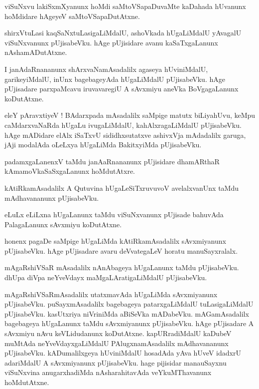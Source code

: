 \documentclass{article}
\begin{document}
\begin{mn}%
viSuNxvu lakiSxmXyanunx hoMdi saMtoVSapaDuvaMte kaDahada hUvanunx hoMdidare hAgeyeV 
saMtoVSapaDutAtxne.
\end{mn}

\begin{mn}%
shirxVtuLasi kaqSaNxtuLasigaLiMdalU, ashoVkada hUgaLiMdalU yAvagalU viSuNxvanunx pUjisabeVku. hAge 
pUjisidare avanu kaSaTxgaLanunx nAshamADutAtxne.
\end{mn}

\begin{mn}%
I janAdaRnananunx shArxvaNamAsadalilx agaseya hUviniMdalU, garikeyiMdalU, inUnx bagebageyAda 
hUgaLiMdalU pUjisabeVku. hAge pUjisadare parxpaMcavu iruvavaregiU A sAvxmiyu aneVka BoVgagaLanunx 
koDutAtxne.
\end{mn}

\begin{mn}%
eleY pAravxtiyeV ! BAdarxpada mAsadalilx saMpige matutx biLiyahUvu, keMpu caMdarxvaNaRda hUgaLu 
ivugaLiMdalU, kahAlxragaLiMdalU pUjisabeVku. hAge mADidare elAlx iSaTxvU sididhxsutatxve ashivxVja 
mAdadalilx garuga, jAji modalAda oLeLxya hUgaLiMda BakitxyiMda pUjisabeVku.
\end{mn}

\begin{mn}%
padamxgaLanenxV taMdu janAaRnananunx pUjisidare dhamARthaR kAmamoVkaSaSxgaLanunx hoMdutAtxre.
\end{mn}

\begin{mn}%
kAtiRkamAsadalilx A Qutuvina hUgaLeSiTxruvuvoV avelalxvanUnx taMdu mAdhavananunx pUjisabeVku.
\end{mn}

\begin{mn}%
eLuLx eLiLxna hUgaLanunx taMdu viSuNxvanunx pUjisade bahuvAda PalagaLanunx sAvxmiyu koDutAtxne.
\end{mn}

\begin{mn}%
honenx pagaDe saMpige hUgaLiMda kAtiRkamAsadalilx sAvxmiyanunx pUjisabeVku. hAge pUjisadare avaru 
deVvategaLeV horatu manuSayxralalx.
\end{mn}

\begin{mn}%
mAgaRshiVSaR mAsadalilx nAnAbageya hUgaLanunx taMdu pUjisabeVku. dhUpa diVpa neYveVdayx 
maMgaLAratigaLiMdalU pUjisabeVku.
\end{mn}

\begin{mn}%
mAgaRshiVSaRmAsadalilx utatxmavAda hUgaLiMda sAvxmiyanunx pUjisabeVku. puSayxmAsadalilx bagebageya 
patarxgaLiMdalU tuLasigaLiMdalU pUjisabeVku. kasUtxriya niVriniMda aBiSeVka mADabeVku. 
mAGamAsadalilx bagebageya hUgaLanunx taMdu sAvxmiyanunx pUjisabeVku. hAge pUjisadare A sAvxmiyu 
nAvu keVLidudanunx koDutAtxne. kapURradiMdalU kaDubeV muMtAda neYveVdayxgaLiMdalU 
PAlugxnamAsadalilx mAdhavananunx pUjisabeVku. kADumalilxgeya hUviniMdalU hosadAda yAva hUveV 
idadxrU adariMdalU A sAvxmiyanunx pUjisabeVku. hage pijisidar manauSayxnu viSuNxvina 
anugarxhadiMda nAsharahitavAda veYkuMThavanunx hoMdutAtxne.
\end{mn}
\end{document}
